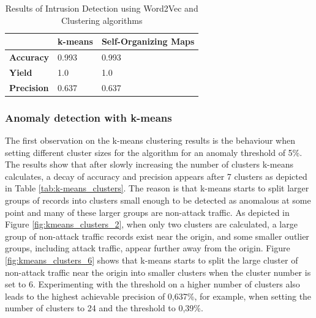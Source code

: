 \documentclass[
    fontsize=12pt,
    headings=small,
    parskip=half,           %
    bibliography=totoc,
    numbers=noenddot,       %
    open=any,               %
    ]{scrreprt}
\begin{document}
\begin{table}[H]
	\caption{Results of Intrusion Detection using Word2Vec and Clustering algorithms}
	\label{tab:results}
	\begin{tabular}{|l|l|l|}
	\hline
					   & \textbf{k-means} & \textbf{Self-Organizing Maps} \\ \hline
	\textbf{Accuracy}  & 0.993            & 0.993                         \\ \hline
	\textbf{Yield}     & 1.0              & 1.0                           \\ \hline
	\textbf{Precision} & 0.637            & 0.637                         \\ \hline
	\end{tabular}
\end{table}

\subsubsection{Anomaly detection with k-means}
\label{subsubsec:anom_k_means}
The first observation on the k-means clustering results is the behaviour when setting different cluster sizes for the algorithm for an anomaly threshold of 5\%. The results show that after slowly increasing the number of clusters k-means calculates, a decay of accuracy and precision appears after 7 clusters as depicted in Table \ref{tab:k-means_clusters}. The reason is that k-means starts to split larger groups of records into clusters small enough to be detected as anomalous at some point and many of these larger groups are non-attack traffic. As depicted in Figure \ref{fig:kmeans_clusters_2}, when only two clusters are calculated, a large group of non-attack traffic records exist near the origin, and some smaller outlier groups, including attack traffic, appear further away from the origin. Figure \ref{fig:kmeans_clusters_6} shows that k-means starts to split the large cluster of non-attack traffic near the origin into smaller clusters when the cluster number is set to 6. Experimenting with the threshold on a higher number of clusters also leads to the highest achievable precision of 0,637\%, for example, when setting the number of clusters to 24 and the threshold to 0,39\%.
\end{document}

